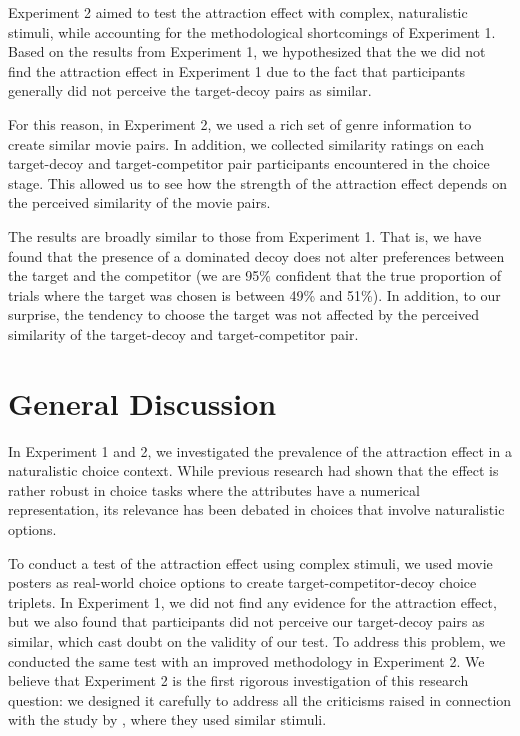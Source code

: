\documentclass[11pt,a4paper]{article}
\begin{document}
Experiment 2 aimed to test the attraction effect with complex, naturalistic stimuli, while accounting for the methodological shortcomings of Experiment 1. Based on the results from Experiment 1, we hypothesized that the we did not find the attraction effect in Experiment 1 due to the fact that participants generally did not perceive the target-decoy pairs as similar.

For this reason, in Experiment 2, we used a rich set of genre information to create similar movie pairs. In addition, we collected similarity ratings on each target-decoy and target-competitor pair participants encountered in the choice stage. This allowed us to see how the strength of the attraction effect depends on the perceived similarity of the movie pairs.

The results are broadly similar to those from Experiment 1. That is, we have found that the presence of a dominated decoy does not alter preferences between the target and the competitor (we are 95\% confident that the true proportion of trials where the target was chosen is between 49\% and 51\%). In addition, to our surprise, the tendency to choose the target was not affected by the perceived similarity of the target-decoy and target-competitor pair.

\newpage

\section{General Discussion} 

In Experiment 1 and 2, we investigated the prevalence of the attraction effect in a naturalistic choice context. While previous research had shown that the effect is rather robust in choice tasks where the attributes have a numerical representation, its relevance has been debated in choices that involve naturalistic options.

To conduct a test of the attraction effect using complex stimuli, we used movie posters as real-world choice options to create target-competitor-decoy choice triplets. In Experiment 1, we did not find any evidence for the attraction effect, but we also found that participants did not perceive our target-decoy pairs as similar, which cast doubt on the validity of our test. To address this problem, we conducted the same test with an improved methodology in Experiment 2. We believe that Experiment 2 is the first rigorous investigation of this research question: we designed it carefully to address all the criticisms raised in connection with the study by \citeauthor{Frederick2014}, where they used similar stimuli.
\end{document}
